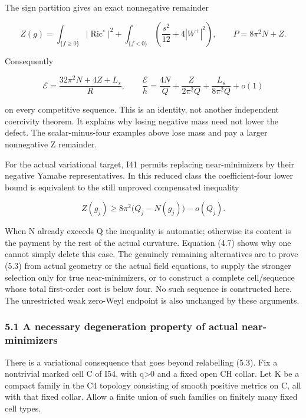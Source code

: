 \documentclass[
  10pt,
]{article}
\begin{document}
The sign partition gives an exact nonnegative remainder

\[
 Z(g)=\int_{\{f\ge0\}}|\operatorname{Ric}^{\circ}|^2
       +\int_{\{f<0\}}\left(\frac{s^2}{12}+4|W^+|^2\right),
 \qquad P=8\pi^2N+Z. \tag{5.1}
\]

Consequently

\[
 \mathcal E=\frac{32\pi^2N+4Z+L_s}{R},\qquad
 \frac{\mathcal E}{h}
 =\frac{4N}{Q}+\frac{Z}{2\pi^2Q}+\frac{L_s}{8\pi^2Q}+o(1)
 \tag{5.2}
\]

on every competitive sequence. This is an identity, not another
independent coercivity theorem. It explains why losing negative mass
need not lower the defect. The scalar-minus-four examples above lose
mass and pay a larger nonnegative Z remainder.

For the actual variational target, I41 permits replacing near-minimizers
by their negative Yamabe representatives. In this reduced class the
coefficient-four lower bound is equivalent to the still unproved
compensated inequality

\[
 Z(g_j)\ge8\pi^2\bigl(Q_j-N(g_j)\bigr)-o(Q_j).
 \tag{5.3}
\]

When N already exceeds Q the inequality is automatic; otherwise its
content is the payment by the rest of the actual curvature. Equation
(4.7) shows why one cannot simply delete this case. The genuinely
remaining alternatives are to prove (5.3) from actual geometry or the
actual field equations, to supply the stronger selection only for true
near-minimizers, or to construct a complete cell/sequence whose total
first-order cost is below four. No such sequence is constructed here.
The unrestricted weak zero-Weyl endpoint is also unchanged by these
arguments.

\hypertarget{a-necessary-degeneration-property-of-actual-near-minimizers}{%
\subsubsection{5.1 A necessary degeneration property of actual
near-minimizers}\label{a-necessary-degeneration-property-of-actual-near-minimizers}}

There is a variational consequence that goes beyond relabelling (5.3).
Fix a nontrivial marked cell C of I54, with q\textgreater0 and a fixed
open CH collar. Let K be a compact family in the C4 topology consisting
of smooth positive metrics on C, all with that fixed collar. Allow a
finite union of such families on finitely many fixed cell types.
\end{document}
